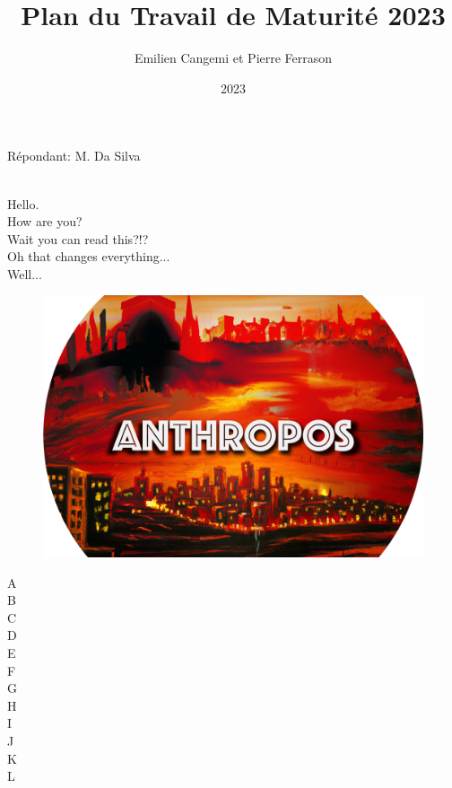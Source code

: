 \documentclass{article}
\title{Plan du Travail de Maturité 2023}
\author{Emilien Cangemi et Pierre Ferrason}
\date{2023}
\begin{document}
\setul{0.5ex}{0.3ex} %
\setul{0.5ex}{0.3ex} %
\setul{0.5ex}{0.3ex} %


\maketitle

\begin{center}
    Répondant: M. Da Silva \\
\end{center} 

\\
\color{white}
    Hello. \\
    How are you?\\
    Wait you can read this?!?\\
    Oh that changes everything...\\
    Well...\\
\color{black}

\begin{center}
    \begin{figure}[h]
        \centering
            \includegraphics[scale=0.6]{image_logo_anthropos.png}
    \end{figure}
\end{center}

\color{white}
    A\\B\\C\\D\\E\\F\\G\\H\\I\\J\\K\\L\\
\color{black}
\end{document}

